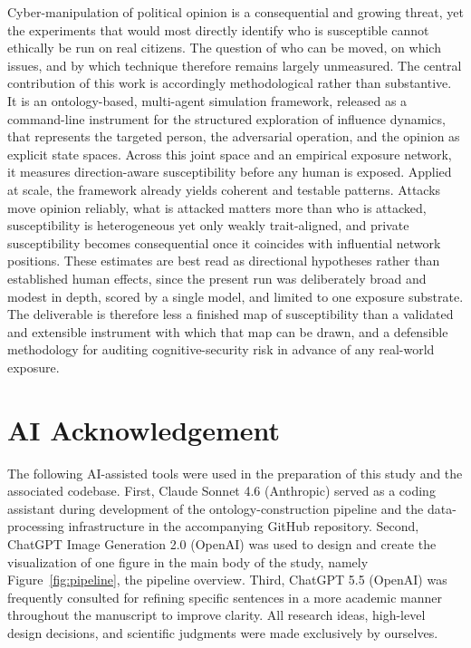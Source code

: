 \documentclass[11pt,a4paper]{article}
\begin{document}
Cyber-manipulation of political opinion is a consequential and growing threat, yet the experiments
that would most directly identify who is susceptible cannot ethically be run on real citizens. The
question of who can be moved, on which issues, and by which technique therefore remains largely
unmeasured. The central contribution of this work is accordingly methodological rather than
substantive. It is an ontology-based, multi-agent simulation framework, released as a command-line
instrument for the structured exploration of influence dynamics, that represents the targeted
person, the adversarial operation, and the opinion as explicit state spaces. Across this joint space
and an empirical exposure network, it measures direction-aware susceptibility before any human is
exposed. Applied at scale, the framework already yields coherent and testable patterns. Attacks move
opinion reliably, what is attacked matters more than who is attacked, susceptibility is heterogeneous
yet only weakly trait-aligned, and private susceptibility becomes consequential once it coincides
with influential network positions. These estimates are best read as directional hypotheses rather
than established human effects, since the present run was deliberately broad and modest in depth,
scored by a single model, and limited to one exposure substrate. The deliverable is therefore less a
finished map of susceptibility than a validated and extensible instrument with which that map can be
drawn, and a defensible methodology for auditing cognitive-security risk in advance of any real-world
exposure.

\clearpage
\section*{AI Acknowledgement}

The following AI-assisted tools were used in the preparation of this study and the associated
codebase. First, Claude Sonnet 4.6 (Anthropic) served as a coding assistant during development of
the ontology-construction pipeline and the data-processing infrastructure in the accompanying
GitHub repository. Second, ChatGPT Image Generation 2.0 (OpenAI) was used to design and create the
visualization of one figure in the main body of the study, namely Figure~\ref{fig:pipeline}, the
pipeline overview. Third, ChatGPT 5.5 (OpenAI) was frequently consulted for refining specific
sentences in a more academic manner throughout the manuscript to improve clarity. All research
ideas, high-level design decisions, and scientific judgments were made exclusively by ourselves.
\end{document}
